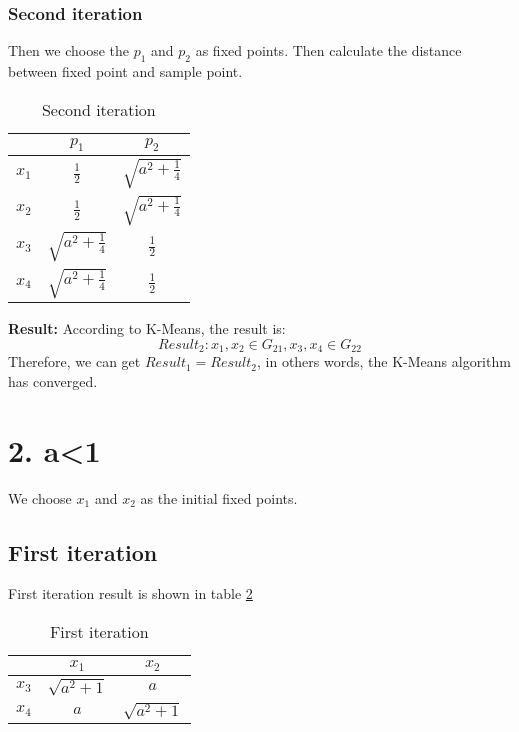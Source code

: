 \documentclass[12pt,letterpaper]{article}
\begin{document}
\subsubsection*{Second iteration}Then we choose the $p_1$ and $p_2$ as fixed points. Then calculate the distance between fixed point and sample point.
\begin{table}[htbp]
  \centering
  \caption{Second iteration}
    \begin{tabular}{|c|c|c|}
    \toprule
          & $p_1$ &$p_2$ \\
    \hline
    $x_1$    &  \textcolor[rgb]{1.000, 0.000, 0.000}{$\frac{1}{2}$}     & $\sqrt{a^2+\frac{1}{4}}$ \\
    \hline
    $x_2$    &  \textcolor[rgb]{1.000, 0.000, 0.000}{$\frac{1}{2}$}      & $\sqrt{a^2+\frac{1}{4}}$ \\
    \hline
    $x_3$    &   $\sqrt{a^2+\frac{1}{4}}$    & \textcolor[rgb]{1.000, 0.000, 0.000}{$\frac{1}{2}$}  \\
    \hline
    $x_4$    &  $\sqrt{a^2+\frac{1}{4}}$     & \textcolor[rgb]{1.000, 0.000, 0.000}{$\frac{1}{2}$}  \\
    \bottomrule
    \end{tabular}%
  \label{Second iteration}%
\end{table}%
\newline
{\bf Result: }According to K-Means, the result is:
\begin{equation}\label{q2eq5}
  Result_2: x_1,x_2\in G_{21}, x_3,x_4\in G_{22}
\end{equation}
Therefore, we can get $Result_1=Result_2$, in others words, the K-Means algorithm has converged.
\section*{2. a<1}
We choose $x_1$ and $x_2$ as the initial fixed points.
\subsection*{First iteration}
First iteration result is shown in table \ref{q2tb3}
\begin{table}[htbp]
  \centering
  \caption{First iteration}
    \begin{tabular}{|c|c|c|}
    \toprule
          & $x_1$    & $x_2$ \\
    \hline
    $x_3$    & $\sqrt{a^2+1}$     & \textcolor[rgb]{1.000, 0.000, 0.000}{$a$} \\
    \hline
    $x_4$    & \textcolor[rgb]{1.000, 0.000, 0.000}{$a$}     & $\sqrt{a^2+1}$ \\
    \bottomrule
    \end{tabular}%
  \label{q2tb3}%
\end{table}%
\end{document}
